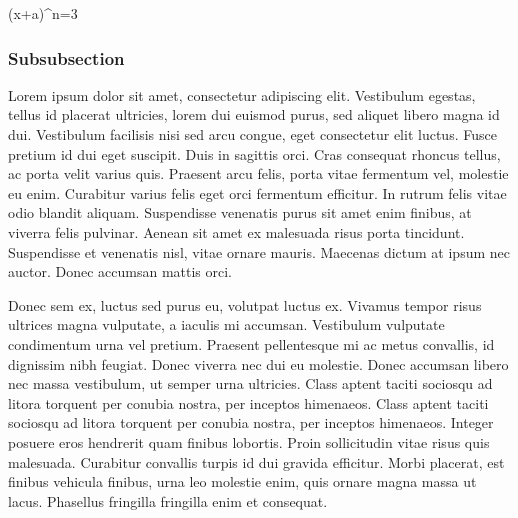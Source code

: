 \documentclass{thesis}
\begin{document}
\begin{thesisequation}{2}
	(x+a)^n=3
\end{thesisequation}

\subsubsection{Subsubsection}
Lorem ipsum dolor sit amet, consectetur adipiscing elit. Vestibulum egestas, tellus id placerat ultricies, lorem dui euismod purus, sed aliquet libero magna id dui. Vestibulum facilisis nisi sed arcu congue, eget consectetur elit luctus. Fusce pretium id dui eget suscipit. Duis in sagittis orci. Cras consequat rhoncus tellus, ac porta velit varius quis. Praesent arcu felis, porta vitae fermentum vel, molestie eu enim. Curabitur varius felis eget orci fermentum efficitur. In rutrum felis vitae odio blandit aliquam. Suspendisse venenatis purus sit amet enim finibus, at viverra felis pulvinar. Aenean sit amet ex malesuada risus porta tincidunt. Suspendisse et venenatis nisl, vitae ornare mauris. Maecenas dictum at ipsum nec auctor. Donec accumsan mattis orci. 

Donec sem ex, luctus sed purus eu, volutpat luctus ex. Vivamus tempor risus ultrices magna vulputate, a iaculis mi accumsan. Vestibulum vulputate condimentum urna vel pretium. Praesent pellentesque mi ac metus convallis, id dignissim nibh feugiat. Donec viverra nec dui eu molestie. Donec accumsan libero nec massa vestibulum, ut semper urna ultricies. Class aptent taciti sociosqu ad litora torquent per conubia nostra, per inceptos himenaeos. Class aptent taciti sociosqu ad litora torquent per conubia nostra, per inceptos himenaeos. Integer posuere eros hendrerit quam finibus lobortis. Proin sollicitudin vitae risus quis malesuada. Curabitur convallis turpis id dui gravida efficitur. Morbi placerat, est finibus vehicula finibus, urna leo molestie enim, quis ornare magna massa ut lacus. Phasellus fringilla fringilla enim et consequat.


\end{document}
